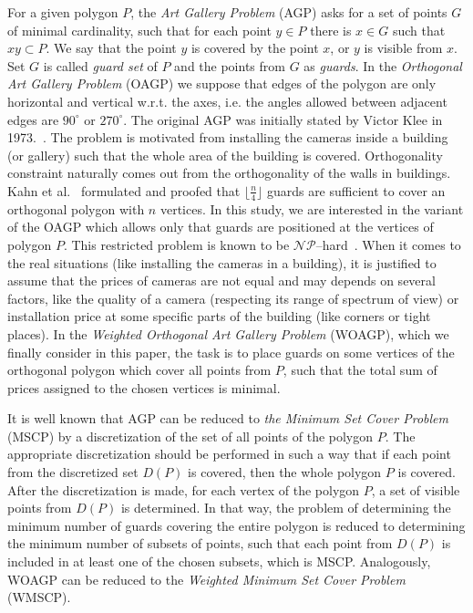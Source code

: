 \documentclass[runningheads,a4paper]{elsarticle}
\begin{document}
	For a given polygon $P$, the \emph{Art Gallery Problem} (AGP) asks for a set of points $G$ of minimal cardinality,  such that for each point $y \in P$ there is $x \in G$ such that $xy \subset P$. We say that the point $y$ is covered by the point $x$, or $y$ is visible from $x$. Set $G$ is called \emph{guard set} of $P$ and the points from $G$ as \emph{guards}. In the \emph{Orthogonal Art Gallery Problem} (OAGP) we suppose that edges of the polygon are only horizontal and vertical w.r.t. the axes, i.e.  the angles allowed between adjacent edges are  $90^{\circ}$ or $270^{\circ}$. The original AGP was initially stated by Victor  Klee in 1973.~\cite{o1987art}.  The problem is motivated from installing the cameras inside a building (or gallery) such that the whole area of the building is covered. Orthogonality constraint naturally comes out from the orthogonality of the walls in buildings. Kahn et al.~\cite{kahn1983traditional} formulated and proofed that 	$\lfloor \frac{n}{4} \rfloor$ guards are  sufficient to cover an orthogonal polygon with $n$ vertices.      In this study, we are interested in the variant of the OAGP which allows only that guards are positioned at the vertices of polygon $P$. This restricted problem is known to be $\mathcal{NP}$--hard~\cite{schuchardt1995two,katz2008guarding}.  When it comes to the real situations (like installing the cameras in a building), it is justified to assume that the prices of cameras are not equal and may depends on several factors, like the quality of a camera   (respecting its range of spectrum of view)  or installation price at some specific parts of the building (like corners or tight places).  In the \emph{Weighted Orthogonal Art Gallery Problem} (WOAGP), which we finally consider in this paper, the task is to place guards on some vertices of the orthogonal polygon which cover all points from $P$, such that the total sum of prices assigned to the chosen vertices is minimal. 
	
	It is well known that AGP can be reduced to \emph{the Minimum Set Cover Problem} (MSCP) by a discretization of the set of all points of the polygon $P$. The appropriate discretization should be performed in such a way that if each point from the discretized set $D(P)$ is covered, then the whole polygon $P$ is covered. After the discretization is made, for each vertex of the polygon $P$, a set of visible points from $D(P)$ is determined. In that way, the problem of determining the minimum number of guards covering the entire polygon is reduced to determining the minimum number of subsets of points, such that each point from $D(P)$ is included in at least one of the chosen subsets, which is MSCP. Analogously, WOAGP can be reduced to the \emph{Weighted Minimum Set Cover Problem} (WMSCP).
	
\end{document}
